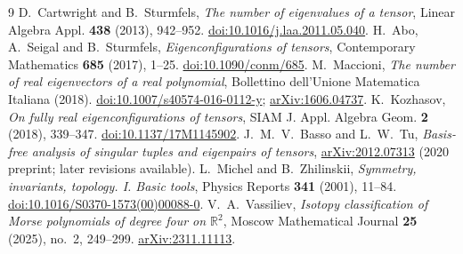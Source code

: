 \documentclass[10pt,a4paper]{article}
\theoremstyle{plain}
\theoremstyle{remark}
\begin{document}
\begin{thebibliography}{9}\setlength{\itemsep}{2pt}
 D.~Cartwright and B.~Sturmfels, \emph{The number of eigenvalues of a tensor}, Linear Algebra Appl. \textbf{438} (2013), 942--952. \href{https://doi.org/10.1016/j.laa.2011.05.040}{doi:10.1016/j.laa.2011.05.040}.
 H.~Abo, A.~Seigal and B.~Sturmfels, \emph{Eigenconfigurations of tensors}, Contemporary Mathematics \textbf{685} (2017), 1--25. \href{https://doi.org/10.1090/conm/685}{doi:10.1090/conm/685}.
 M.~Maccioni, \emph{The number of real eigenvectors of a real polynomial}, Bollettino dell'Unione Matematica Italiana (2018). \href{https://doi.org/10.1007/s40574-016-0112-y}{doi:10.1007/s40574-016-0112-y}; \href{https://arxiv.org/abs/1606.04737}{arXiv:1606.04737}.
 K.~Kozhasov, \emph{On fully real eigenconfigurations of tensors}, SIAM J. Appl. Algebra Geom. \textbf{2} (2018), 339--347. \href{https://doi.org/10.1137/17M1145902}{doi:10.1137/17M1145902}.
 J.~M.~V.~Basso and L.~W.~Tu, \emph{Basis-free analysis of singular tuples and eigenpairs of tensors}, \href{https://arxiv.org/abs/2012.07313}{arXiv:2012.07313} (2020 preprint; later revisions available).
 L.~Michel and B.~Zhilinskii, \emph{Symmetry, invariants, topology. I. Basic tools}, Physics Reports \textbf{341} (2001), 11--84. \href{https://doi.org/10.1016/S0370-1573(00)00088-0}{doi:10.1016/S0370-1573(00)00088-0}.
 V.~A.~Vassiliev, \emph{Isotopy classification of Morse polynomials of degree four on $\mathbb R^2$}, Moscow Mathematical Journal \textbf{25} (2025), no.~2, 249--299. \href{https://arxiv.org/abs/2311.11113}{arXiv:2311.11113}.
\end{thebibliography}
\end{document}
